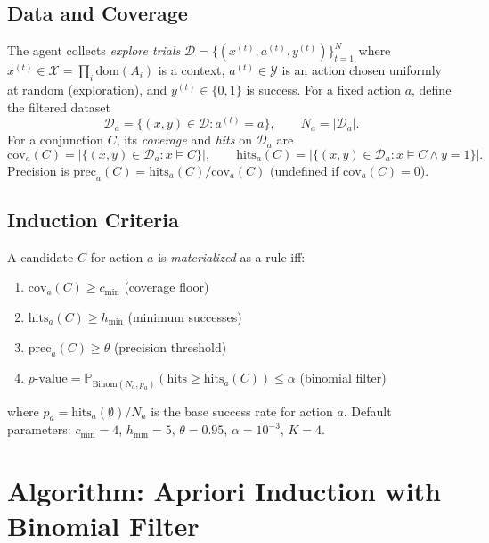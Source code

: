 \documentclass[11pt]{article}
\newcommand{\Prob}{\mathbb{P}}
\newcommand{\Binom}{\mathrm{Binom}}
\newcommand{\calD}{\mathcal{D}}
\newcommand{\calX}{\mathcal{X}}
\newcommand{\calY}{\mathcal{Y}}
\begin{document}
\subsection{Data and Coverage}
The agent collects \emph{explore trials} $\calD = \{(x^{(t)}, a^{(t)}, y^{(t)})\}_{t=1}^N$ where $x^{(t)} \in \calX = \prod_i \mathrm{dom}(A_i)$ is a context, $a^{(t)} \in \calY$ is an action chosen uniformly at random (exploration), and $y^{(t)} \in \{0,1\}$ is success. For a fixed action $a$, define the filtered dataset
\[
\calD_a = \{(x, y) \in \calD : a^{(t)} = a\}, \qquad N_a = |\calD_a|.
\]
For a conjunction $C$, its \emph{coverage} and \emph{hits} on $\calD_a$ are
\[
\mathrm{cov}_a(C) = |\{(x,y) \in \calD_a : x \models C\}|, \qquad
\mathrm{hits}_a(C) = |\{(x,y) \in \calD_a : x \models C \land y=1\}|.
\]
Precision is $\mathrm{prec}_a(C) = \mathrm{hits}_a(C) / \mathrm{cov}_a(C)$ (undefined if $\mathrm{cov}_a(C)=0$).

\subsection{Induction Criteria}
A candidate $C$ for action $a$ is \emph{materialized} as a rule iff:
\begin{enumerate}
    \item $\mathrm{cov}_a(C) \geq c_{\min}$ (coverage floor)
    \item $\mathrm{hits}_a(C) \geq h_{\min}$ (minimum successes)
    \item $\mathrm{prec}_a(C) \geq \theta$ (precision threshold)
    \item $p\text{-value} = \Prob_{\Binom(N_a, p_a)}(\mathrm{hits} \geq \mathrm{hits}_a(C)) \leq \alpha$ (binomial filter)
\end{enumerate}
where $p_a = \mathrm{hits}_a(\emptyset) / N_a$ is the base success rate for action $a$. Default parameters: $c_{\min}=4$, $h_{\min}=5$, $\theta=0.95$, $\alpha=10^{-3}$, $K=4$.

\section{Algorithm: Apriori Induction with Binomial Filter}
\end{document}

